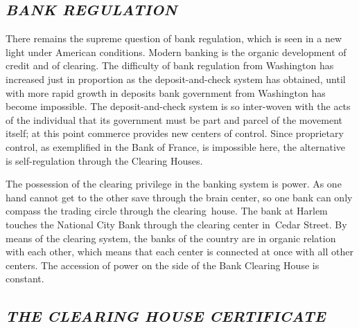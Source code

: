\documentclass[openany,nobib]{tufte-book}
\begin{document}
\hypertarget{bank-regulation}{%
\subsection{\texorpdfstring{\emph{BANK
REGULATION}}{BANK REGULATION}}\label{bank-regulation}}

There remains the supreme question of bank regulation, which is seen in
a new light under American conditions. Modern banking is the organic
development of credit and of clearing. The difficulty of bank regulation
from Washington has increased just in proportion as the
deposit-and-check system has obtained, until with more rapid growth in
deposits bank government from Washington has become impossible. The
deposit-and-check system is so inter-woven with the acts of the
individual that its government must be part and parcel of the movement
itself; at this point commerce provides new centers of control. Since
proprietary control, as exemplified in the Bank of France, is impossible
here, the alternative is self-regulation through the Clearing Houses. ~

The possession of the clearing privilege in the banking system is power.
As one hand cannot get to the other save through the brain center, so
one bank can only compass the trading circle through the clearing~house.
The bank at Harlem touches the National City Bank through the clearing
center in~Cedar Street. By means of the clearing system, the banks of
the country are in organic relation with each other, which means that
each center is connected at once with all other centers. The accession
of power on the side of the Bank Clearing House is constant.~

\hypertarget{the-clearing-house-certificate}{%
\subsection{\texorpdfstring{\emph{THE CLEARING HOUSE
CERTIFICATE}}{THE CLEARING HOUSE CERTIFICATE}}\label{the-clearing-house-certificate}}
\end{document}
